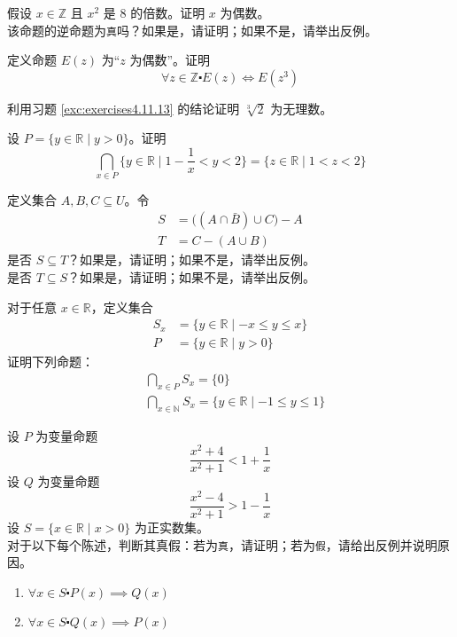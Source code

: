 \begin{exercise}
    假设 $x \in \mathbb{Z}$ 且 $x^2$ 是 $8$ 的倍数。证明 $x$ 为偶数。\\
    该命题的逆命题为\verb|真|吗？如果是，请证明；如果不是，请举出反例。
\end{exercise}

\begin{exercise} \label{exc:exercises4.11.13}
    定义命题 $E(z)$ 为``$z$ 为偶数''。证明
    \[\forall z \in \mathbb{Z} \centerdot E(z) \iff E(z^3)\]
\end{exercise}

\begin{exercise}
    利用习题 \ref{exc:exercises4.11.13} 的结论证明 $\sqrt[3]{2}$ 为无理数。
\end{exercise}

\begin{exercise}
    设 $P = \{y \in \mathbb{R} \mid y > 0\}$。证明
    \[\bigcap_{x \in P} \Big\{y \in \mathbb{R} \mid 1-\frac{1}{x} < y < 2\Big\} = \{z \in \mathbb{R} \mid 1 < z <2\}\]
\end{exercise}

\begin{exercise}
    定义集合 $A, B, C \subseteq U$。令
    \begin{align*}
        S &= \big((A \cap \bar{B}) \cup C \big)-A \\
        T &= C-(A \cup B)
    \end{align*}
    是否 $S \subseteq T$？如果是，请证明；如果不是，请举出反例。\\
    是否 $T \subseteq S$？如果是，请证明；如果不是，请举出反例。
\end{exercise}

\begin{exercise}
    对于任意 $x \in \mathbb{R}$，定义集合
    \begin{align*}
        S_x &= \{y \in \mathbb{R} \mid -x \le y \le x\}\\
        P &= \{y \in \mathbb{R} \mid y > 0\}
    \end{align*}
    证明下列命题：
    \begin{align*}
        &\bigcap_{x \in P} S_x = \{0\} \\
        &\bigcap_{x \in \mathbb{N}} S_x = \{y \in \mathbb{R} \mid -1 \le y \le 1\}
    \end{align*}
\end{exercise}

\begin{exercise} \label{exc:exercises4.11.22}
    设 $P$ 为变量命题
    \[\frac{x^2+4}{x^2+1} < 1+\frac{1}{x}\]
    设 $Q$ 为变量命题
    \[\frac{x^2-4}{x^2+1} > 1-\frac{1}{x}\]
    设 $S = \{x \in \mathbb{R} \mid x > 0\}$ 为正实数集。\\
    对于以下每个陈述，判断其真假：若为\verb|真|，请证明；若为\verb|假|，请给出反例并说明原因。
    \begin{enumerate}[label=(\alph*)]
        \item $\forall x \in S \centerdot P(x) \implies Q(x)$
        \item $\forall x \in S \centerdot Q(x) \implies P(x)$
    \end{enumerate}  
\end{exercise}

